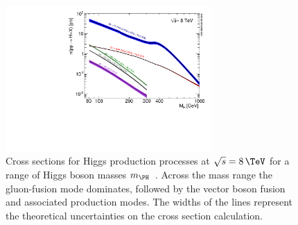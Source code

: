 \begin{figure}[htbp]
 \includegraphics[width=0.7\textwidth]{Chapter01/Images/Higgs_XS_8TeV_lx.pdf}
\caption[Cross sections for Higgs production processes at $\sqrt{s}=8\,\TeV$ for
a range of Higgs boson masses.]{Cross sections for Higgs production processes at
$\sqrt{s}=8\,\TeV$ for a range of Higgs boson masses $m_{\PH}$~\cite{ARTICLE:HandbookofLHCHiggsCrossSectionsHiggsProperties}. Across the
mass range the gluon-fusion mode dominates, followed by the vector boson fusion
and associated production modes. The widths of the lines represent the
theoretical uncertainties on the cross section calculation.}
\label{fig:SMHiggsXS}
\end{figure}


